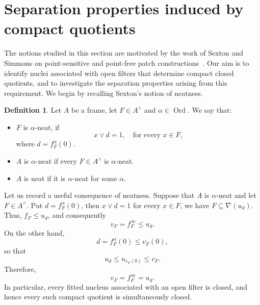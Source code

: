 \documentclass[11pt]{amsart}
\DeclareMathOperator{\pt}{pt}
\DeclareMathOperator{\Ord}{Ord}
\theoremstyle{plain}
\theoremstyle{definition}
\newtheorem{dfn}[thm]{Definition}
\begin{document}

\section{Separation properties induced by compact quotients}\label{Definiciones}

The notions studied in this section are motivated by the work
of Sexton and Simmons on point-sensitive and point-free patch
constructions~\cite{sexton2006ordinal,sexton2006point,sexton2000,sexton2003}. 
Our aim is to identify nuclei associated with
open filters that determine compact closed quotients, and to
investigate the separation properties arising from this
requirement. We begin by recalling Sexton's notion of
neatness.

\begin{dfn}\label{Neat}
Let $A$ be a frame, let $F\in A^\wedge$ and $\alpha\in \Ord$. We say that:
\begin{itemize}
	\item $F$ is $\alpha$-neat, if 
	\[
	x\vee d=1, \quad \text{for every }x\in F,
	\]
	where $d=f^\alpha_F(0)$.
	\item $A$ is $\alpha$-neat if every $F\in A^\wedge$ is $\alpha$-neat.
	\item $A$ is neat if it is $\alpha$-neat for some $\alpha$. 
\end{itemize}
\end{dfn}


Let us record a useful consequence of neatness. Suppose
that $A$ is $\alpha$-neat and let $F\in A^\wedge$.
Put $d=f_F^\alpha(0)$, then $x\vee d=1$ for every
$x\in F$, we have $F\subseteq \nabla(u_d)$. Thus,
$f_F\leq u_d$, and consequently
\[
v_F=f_F^\infty\leq u_d.
\]
On the other hand,
\[
d=f_F^\alpha(0)\leq v_F(0),
\]
so that
\[
u_d\leq u_{v_F(0)}\leq v_F.
\]
Therefore,
\[
v_F=f_F^\infty=u_d.
\]
In particular, every fitted nucleus associated with an
open filter is closed, and hence every such compact
quotient is simultaneously closed.
\end{document}

